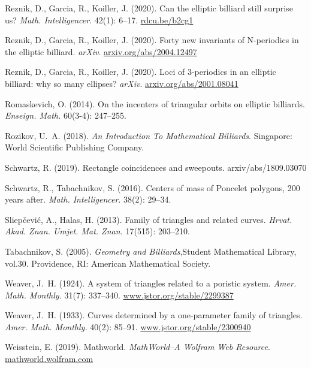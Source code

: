 \documentclass{amsart}
\theoremstyle{definition}
\begin{document}
\begin{thebibliography}{10}
Reznik, D., Garcia, R., Koiller, J. (2020).
\newblock Can the elliptic billiard still surprise us?
\newblock \emph{Math. Intelligencer}. 42(1): 6--17.
\newblock \url{rdcu.be/b2cg1}

Reznik, D., Garcia, R., Koiller, J. (2020).
\newblock Forty new invariants of {N}-periodics in the elliptic billiard.
\newblock \emph{arXiv}.
\newblock \url{arxiv.org/abs/2004.12497}

Reznik, D., Garcia, R., Koiller, J. (2020).
\newblock Loci of 3-periodics in an elliptic billiard: why so many ellipses?
\newblock \emph{arXiv}.
\newblock \url{arxiv.org/abs/2001.08041}

Romaskevich, O. (2014).
\newblock On the incenters of triangular orbits on elliptic billiards.
\newblock \emph{Enseign. Math.} 60(3-4): 247--255.

Rozikov, U.~A. (2018).
\newblock \emph{An Introduction To Mathematical Billiards}.
\newblock Singapore: World Scientific Publishing Company.

Schwartz, R. (2019).
\newblock Rectangle coincidences and sweepouts.
\newblock arxiv/abs/1809.03070

Schwartz, R., Tabachnikov, S. (2016).
\newblock Centers of mass of {P}oncelet polygons, 200 years after.
\newblock \emph{Math. Intelligencer}. 38(2): 29--34.

Sliep\v{c}evi\'c, A., Halas, H. (2013).
\newblock Family of triangles and related curves.
\newblock \emph{
Hrvat. Akad. Znan. Umjet. Mat. Znan.} 17(515): 203--210.

Tabachnikov, S. (2005).
\newblock \emph{Geometry and Billiards},Student Mathematical
  Library, vol.30.
\newblock Providence, RI: American Mathematical Society.

Weaver, J.~H. (1924).
\newblock A system of triangles related to a poristic system.
\newblock \emph{Amer. Math. Monthly.} 31(7): 337--340.
\newblock \url{www.jstor.org/stable/2299387}

Weaver, J.~H. (1933).
\newblock Curves determined by a one-parameter family of triangles.
\newblock \emph{Amer. Math. Monthly.} 40(2): 85--91.
\newblock \url{www.jstor.org/stable/2300940}

Weisstein, E. (2019).
\newblock Mathworld.
\newblock \emph{MathWorld--A Wolfram Web Resource}.
\newblock \url{mathworld.wolfram.com}

\end{thebibliography}

\end{document}

